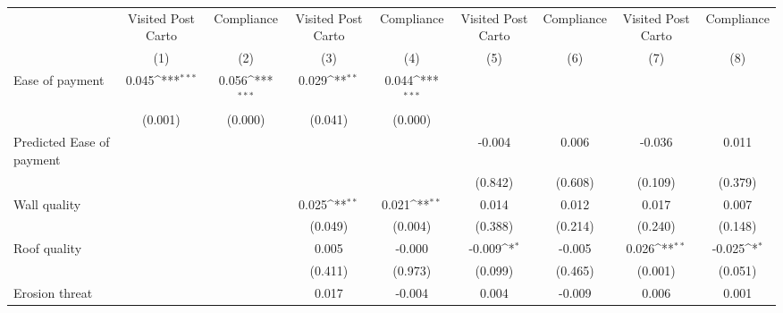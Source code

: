 {
\def\sym#1{\ifmmode^{#1}\else\(^{#1}\)\fi}
\begin{tabular}{l*{8}{c}}
\toprule
                &\multicolumn{1}{c}{Visited Post Carto}&\multicolumn{1}{c}{Compliance}&\multicolumn{1}{c}{Visited Post Carto}&\multicolumn{1}{c}{Compliance}&\multicolumn{1}{c}{Visited Post Carto}&\multicolumn{1}{c}{Compliance}&\multicolumn{1}{c}{Visited Post Carto}&\multicolumn{1}{c}{Compliance}\\
                &\multicolumn{1}{c}{(1)}         &\multicolumn{1}{c}{(2)}         &\multicolumn{1}{c}{(3)}         &\multicolumn{1}{c}{(4)}         &\multicolumn{1}{c}{(5)}         &\multicolumn{1}{c}{(6)}         &\multicolumn{1}{c}{(7)}         &\multicolumn{1}{c}{(8)}         \\
\midrule
Ease of payment &    0.045\sym{***}&    0.056\sym{***}&    0.029\sym{**} &    0.044\sym{***}&                  &                  &                  &                  \\
                &  (0.001)         &  (0.000)         &  (0.041)         &  (0.000)         &                  &                  &                  &                  \\
Predicted Ease of payment&                  &                  &                  &                  &   -0.004         &    0.006         &   -0.036         &    0.011         \\
                &                  &                  &                  &                  &  (0.842)         &  (0.608)         &  (0.109)         &  (0.379)         \\
Wall quality    &                  &                  &    0.025\sym{**} &    0.021\sym{**} &    0.014         &    0.012         &    0.017         &    0.007         \\
                &                  &                  &  (0.049)         &  (0.004)         &  (0.388)         &  (0.214)         &  (0.240)         &  (0.148)         \\
Roof quality    &                  &                  &    0.005         &   -0.000         &   -0.009\sym{*}  &   -0.005         &    0.026\sym{**} &   -0.025\sym{*}  \\
                &                  &                  &  (0.411)         &  (0.973)         &  (0.099)         &  (0.465)         &  (0.001)         &  (0.051)         \\
Erosion threat  &                  &                  &    0.017         &   -0.004         &    0.004         &   -0.009         &    0.006         &    0.001         \\

\end{tabular}}
